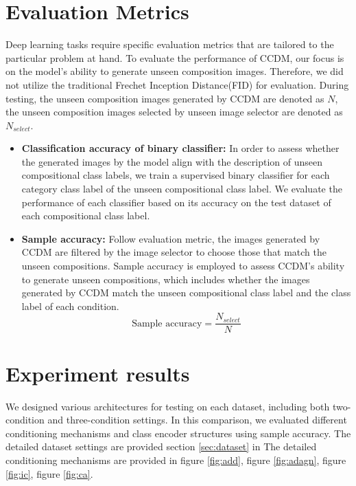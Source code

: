 \section{Evaluation Metrics}
Deep learning tasks require specific evaluation metrics that are tailored to the particular problem at hand. To evaluate the performance of CCDM, our focus is on the model's ability to generate unseen composition images. Therefore, we did not utilize the traditional Frechet Inception Distance(FID) \cite{heusel2017gans} for evaluation. During testing, the unseen composition images generated by CCDM are denoted as $N$, the unseen composition images selected by unseen image selector are denoted as $N_{select}$.
\begin{itemize}
    \item \textbf{Classification accuracy of binary classifier:} In order to assess whether the generated images by the model align with the description of unseen compositional class labels, we train a supervised binary classifier for each category class label of the unseen compositional class label. We evaluate the performance of each classifier based on its accuracy on the test dataset of each compositional class label.
    \item \textbf{Sample accuracy:} Follow \cite{liu2022compositional} evaluation metric, the images generated by CCDM are filtered by the image selector to choose those that match the unseen compositions. Sample accuracy is employed to assess CCDM's ability to generate unseen compositions, which includes whether the images generated by CCDM match the unseen compositional class label and the class label of each condition.
    \begin{equation}
        \text{Sample accuracy} = \frac{N_{select}}{N}
    \end{equation}
\end{itemize}


\section{Experiment results}
We designed various architectures for testing on each dataset, including both two-condition and three-condition settings. In this comparison, we evaluated different conditioning mechanisms and class encoder structures using sample accuracy. The detailed dataset settings are provided section \ref{sec:dataset} in  The detailed conditioning mechanisms are provided in figure \ref{fig:add}, figure \ref{fig:adagn}, figure \ref{fig:ic}, figure \ref{fig:ca}.

